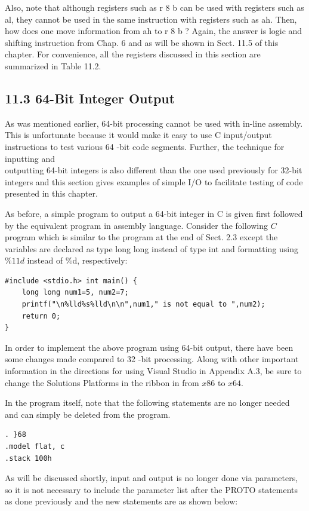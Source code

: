 \documentclass[10pt]{book}
\begin{document}
\begin{center}
\begin{center}
\begin{center}
\begin{center}
Also, note that although registers such as r 8 b can be used with registers such as al, they cannot be used in the same instruction with registers such as ah. Then, how does one move information from ah to r 8 b ? Again, the answer is logic and shifting instruction from Chap. 6 and as will be shown in Sect. 11.5 of this chapter. For convenience, all the registers discussed in this section are summarized in Table 11.2.

\subsection*{11.3 64-Bit Integer Output}
As was mentioned earlier, 64-bit processing cannot be used with in-line assembly. This is unfortunate because it would make it easy to use C input/output instructions to test various 64 -bit code segments. Further, the technique for inputting and\\
outputting 64-bit integers is also different than the one used previously for 32-bit integers and this section gives examples of simple I/O to facilitate testing of code presented in this chapter.

As before, a simple program to output a 64-bit integer in C is given first followed by the equivalent program in assembly language. Consider the following $C$ program which is similar to the program at the end of Sect. 2.3 except the variables are declared as type long long instead of type int and formatting using $\% 11 d$ instead of \%d, respectively:

\begin{verbatim}
#include <stdio.h> int main() {
    long long num1=5, num2=7;
    printf("\n%lld%s%lld\n\n",num1," is not equal to ",num2);
    return 0;
}
\end{verbatim}

In order to implement the above program using 64-bit output, there have been some changes made compared to 32 -bit processing. Along with other important information in the directions for using Visual Studio in Appendix A.3, be sure to change the Solutions Platforms in the ribbon in from $x 86$ to $x 64$.

In the program itself, note that the following statements are no longer needed and can simply be deleted from the program.

\begin{verbatim}
. }68
.model flat, c
.stack 100h
\end{verbatim}

As will be discussed shortly, input and output is no longer done via parameters, so it is not necessary to include the parameter list after the PROTO statements as done previously and the new statements are as shown below:


\end{center}
\end{center}
\end{center}
\end{center}
\end{document}
